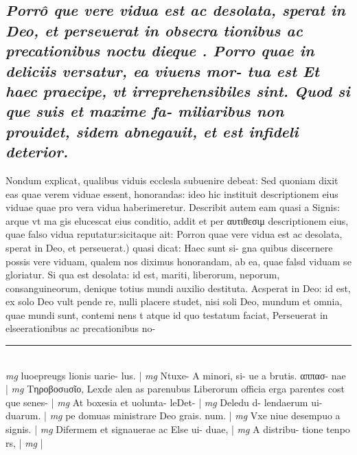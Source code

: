 \documentclass{article}
\begin{document}
\begin{pages}
{}
\subsection*{\textit{Porrô que vere vidua est ac desolata, sperat in Deo, et perseuerat in obsecra tionibus ac precationibus noctu dieque . Porro quae in deliciis versatur, ea viuens mor- tua est Et haec praecipe, vt irreprehensibiles sint. Quod si que suis et maxime fa- miliaribus non prouidet, sidem abnegauit, et est infideli deterior. }}\pstart Nondum explicat, qualibus viduis ecclesla subuenire debeat: Sed quoniam dixit eas quae verem viduae essent, honorandas: ideo hic instituit descriptionem eius viduae quae pro vera vidua haberimeretur. Describit autem eam quasi a Signis: arque vt ma gis elucescat eius conditio, addit et per αυτιθεσιμ descriptionem eius, quae falso vidua reputatur:sicitaque ait:  \pend\pstart Porron quae vere vidua est ac desolata, sperat in Deo, et perseuerat.) quasi dicat: Haec sunt si- gna quibus discernere possis vere viduam, qualem nos diximus honorandam, ab ea, quae falsd viduam se gloriatur. Si qua est desolata: id est, mariti, liberorum, neporum, consanguineorum, denique totius mundi auxilio destituta. Acsperat in Deo: id est, ex solo Deo vult pende re, nulli placere studet, nisi soli Deo, mundum et omnia, quae mundi sunt, contemi nens t atque id quo testatum faciat, Perseuerat in elseerationibus ac precationibus no-  \pend
\vspace{0.5cm}\noindent
\vspace{0.2cm}\rule{1cm}{0.2pt}\\ 
\hspace{0.2cm}\textit{mg}
\footnotesize luoepreugs lionis uarie- lus. 
\normalsize| 
\hspace{0.2cm}\textit{mg}
\footnotesize  Ntuxe- A minori, si- ue a brutis. αππασ- nae 
\normalsize| 
\hspace{0.2cm}\textit{mg}
\footnotesize Τηροβοσuσῖο, Lexde alen as parenubus  Liberorum officia erga parentes cost que senes- 
\normalsize| 
\hspace{0.2cm}\textit{mg}
\footnotesize At boxesia et uolunta- leDet- 
\normalsize| 
\hspace{0.2cm}\textit{mg}
\footnotesize Deledu d- lendaerum ui- duarum. 
\normalsize| 
\hspace{0.2cm}\textit{mg}
\footnotesize pe domuas ministrare Deo grais. num. 
\normalsize| 
\hspace{0.2cm}\textit{mg}
\footnotesize Vxe niue desempuo a signis. 
\normalsize| 
\hspace{0.2cm}\textit{mg}
\footnotesize Difermem et signauerae ac Else ui- duae, 
\normalsize| 
\hspace{0.2cm}\textit{mg}
\footnotesize A distribu- tione tenpo rs, 
\normalsize| 
\hspace{0.2cm}\textit{mg}
\footnotesize 
\normalsize| 

\end{pages}
\end{document}
